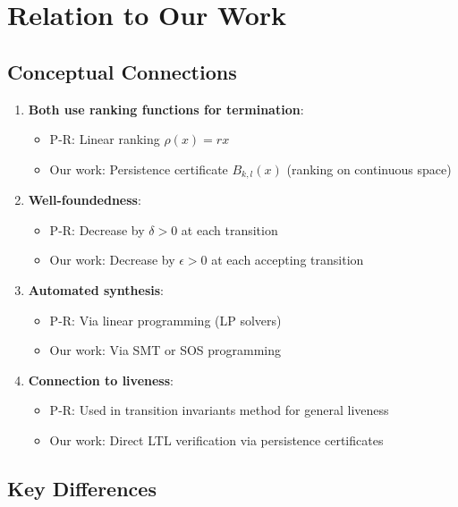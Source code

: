 \documentclass{article}
\begin{document}
\section{Relation to Our Work}

\subsection{Conceptual Connections}

\begin{enumerate}
    \item \textbf{Both use ranking functions for termination}:
    \begin{itemize}
        \item P-R: Linear ranking $\rho(x) = rx$
        \item Our work: Persistence certificate $B_{k,l}(x)$ (ranking on continuous space)
    \end{itemize}

    \item \textbf{Well-foundedness}:
    \begin{itemize}
        \item P-R: Decrease by $\delta > 0$ at each transition
        \item Our work: Decrease by $\epsilon > 0$ at each accepting transition
    \end{itemize}

    \item \textbf{Automated synthesis}:
    \begin{itemize}
        \item P-R: Via linear programming (LP solvers)
        \item Our work: Via SMT or SOS programming
    \end{itemize}

    \item \textbf{Connection to liveness}:
    \begin{itemize}
        \item P-R: Used in transition invariants method for general liveness
        \item Our work: Direct LTL verification via persistence certificates
    \end{itemize}
\end{enumerate}

\subsection{Key Differences}
\end{document}
